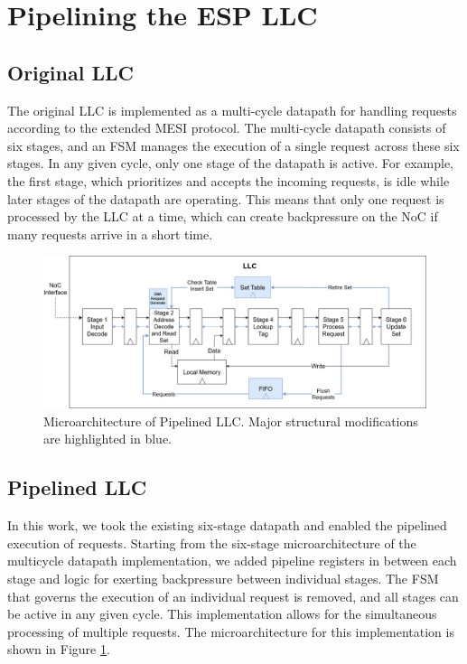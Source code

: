 \section{Pipelining the ESP LLC}
\label{sec:llcImplementations}
\subsection{Original LLC}
The original LLC is implemented as a multi-cycle datapath for handling requests
according to the extended MESI protocol. The multi-cycle datapath consists of
six stages, and an FSM manages the execution of a single request across these
six stages.  In any given cycle, only one stage of the datapath is active. For
example, the first stage, which prioritizes and accepts the incoming requests,
is idle while later stages of the datapath are operating. This means that only
one request is processed by the LLC at a time, which can create backpressure
on the NoC if many requests arrive in a short time.

\begin{figure}[t]
    \centering
    \captionsetup{justification=centering, format=hang}
    \includegraphics[width=\linewidth]{fig/LLC_muarc_pipeline2.png}
    \caption{Microarchitecture of Pipelined LLC. Major structural modifications are highlighted in blue.}
    \label{fig:pipeline_muarc}
\end{figure}

\subsection{Pipelined LLC}
In this work, we took the existing six-stage datapath and enabled the pipelined
execution of requests. Starting from the six-stage microarchitecture of the
multicycle datapath implementation, we added pipeline registers in between each
stage and logic for exerting backpressure between individual stages. The FSM
that governs the execution of an individual request is removed, and all stages
can be active in any given cycle. This implementation allows for the
simultaneous processing of multiple requests. The microarchitecture for this
implementation is shown in Figure \ref{fig:pipeline_muarc}.

